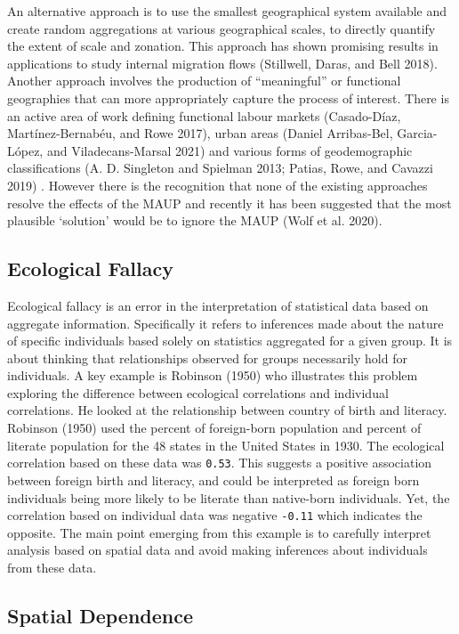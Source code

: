\documentclass[
  letterpaper,
  krantz2]{style/krantz}
\begin{document}
An alternative approach is to use the smallest geographical system
available and create random aggregations at various geographical scales,
to directly quantify the extent of scale and zonation. This approach has
shown promising results in applications to study internal migration
flows (Stillwell, Daras, and Bell 2018). Another approach involves the
production of ``meaningful'' or functional geographies that can more
appropriately capture the process of interest. There is an active area
of work defining functional labour markets (Casado-Díaz,
Martínez-Bernabéu, and Rowe 2017), urban areas (Daniel Arribas-Bel,
Garcia-López, and Viladecans-Marsal 2021) and various forms of
geodemographic classifications (A. D. Singleton and Spielman 2013;
Patias, Rowe, and Cavazzi 2019) . However there is the recognition that
none of the existing approaches resolve the effects of the MAUP and
recently it has been suggested that the most plausible `solution' would
be to ignore the MAUP (Wolf et al. 2020).

\hypertarget{ecological-fallacy}{%
\subsection{Ecological Fallacy}\label{ecological-fallacy}}

Ecological fallacy is an error in the interpretation of statistical data
based on aggregate information. Specifically it refers to inferences
made about the nature of specific individuals based solely on statistics
aggregated for a given group. It is about thinking that relationships
observed for groups necessarily hold for individuals. A key example is
Robinson (1950) who illustrates this problem exploring the difference
between ecological correlations and individual correlations. He looked
at the relationship between country of birth and literacy. Robinson
(1950) used the percent of foreign-born population and percent of
literate population for the 48 states in the United States in 1930. The
ecological correlation based on these data was \texttt{0.53}. This
suggests a positive association between foreign birth and literacy, and
could be interpreted as foreign born individuals being more likely to be
literate than native-born individuals. Yet, the correlation based on
individual data was negative \texttt{-0.11} which indicates the
opposite. The main point emerging from this example is to carefully
interpret analysis based on spatial data and avoid making inferences
about individuals from these data.

\hypertarget{spatial-dependence}{%
\subsection{Spatial Dependence}\label{spatial-dependence}}
\end{document}
